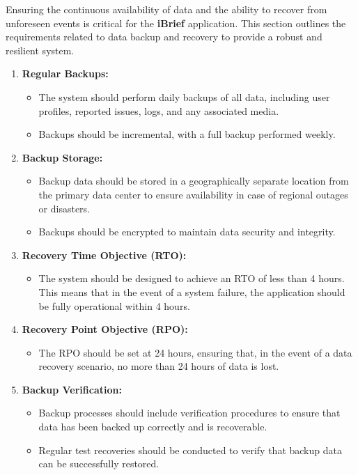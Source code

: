 Ensuring the continuous availability of data and the ability to recover from unforeseen events is critical for the \textbf{iBrief} application. This section outlines the requirements related to data \gls{backup} and \gls{recovery} to provide a robust and resilient system.

\begin{enumerate}
    \item \textbf{Regular Backups:}
    \begin{itemize}
        \item The system should perform daily backups of all data, including user profiles, reported issues, logs, and any associated media. 
        \item Backups should be incremental, with a full \gls{backup} performed weekly.
    \end{itemize}
    
    \item \textbf{Backup Storage:}
    \begin{itemize}
        \item Backup data should be stored in a geographically separate location from the primary data center to ensure availability in case of regional outages or disasters.
        \item Backups should be encrypted to maintain data security and integrity.
    \end{itemize}
    
    \item \textbf{Recovery Time Objective (RTO):}
    \begin{itemize}
        \item The system should be designed to achieve an RTO of less than 4 hours. This means that in the event of a system failure, the application should be fully operational within 4 hours.
    \end{itemize}
    
    \item \textbf{Recovery Point Objective (RPO):}
    \begin{itemize}
        \item The RPO should be set at 24 hours, ensuring that, in the event of a data \gls{recovery} scenario, no more than 24 hours of data is lost.
    \end{itemize}

    \item \textbf{Backup Verification:}
    \begin{itemize}
        \item Backup processes should include verification procedures to ensure that data has been backed up correctly and is recoverable.
        \item Regular test recoveries should be conducted to verify that \gls{backup} data can be successfully restored.
    \end{itemize}


\end{enumerate}
